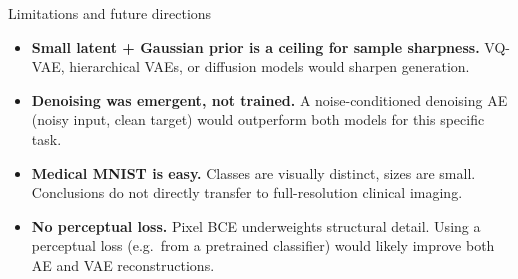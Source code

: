 \documentclass[aspectratio=169]{beamer}
\begin{document}
\begin{frame}{Limitations and future directions}
  \begin{itemize}
    \item \textbf{Small latent + Gaussian prior is a ceiling for sample sharpness.} VQ-VAE, hierarchical VAEs, or diffusion models would sharpen generation.
    \item \textbf{Denoising was emergent, not trained.} A noise-conditioned denoising AE (noisy input, clean target) would outperform both models for this specific task.
    \item \textbf{Medical MNIST is easy.} Classes are visually distinct, sizes are small. Conclusions do not directly transfer to full-resolution clinical imaging.
    \item \textbf{No perceptual loss.} Pixel BCE underweights structural detail. Using a perceptual loss (e.g.\ from a pretrained classifier) would likely improve both AE and VAE reconstructions.
  \end{itemize}
\end{frame}
\end{document}
